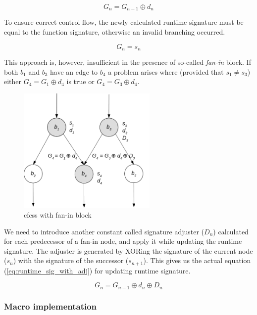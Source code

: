 \begin{equation}
\label{eq:runtime_sig}
G_n = G_{n-1} \oplus d_n
\end{equation}

To ensure correct control flow, the newly calculated runtime signature must be equal to the function signature, otherwise an invalid branching occurred.

\begin{equation}
\label{eq:sig_check}
G_n = s_n
\end{equation}

This approach is, however, insufficient in the presence of so-called \textit{fan-in} block. If both {$b_1$} and {$b_3$} have an edge to {$b_4$} a problem arises where (provided that {$s_1 \ne s_3$}) either {$G_4 = G_1 \oplus d_4$} is true or {$G_4 = G_3 \oplus d_4$}.

\begin{figure}[!h]
    \centering
    \includegraphics[width=0.6\textwidth]{diagrams/cfcss/adjuster.png}
    \caption{\acrshort{cfcss} with fan-in block \cite{coast:cfcss}}
\end{figure}

We need to introduce another constant called signature adjuster ({$D_n$}) calculated for each predecessor of a fan-in node, and apply it while updating the runtime signature. The adjuster is generated by XORing the signature of the current node ({$s_n$}) with the signature of the successor ({$s_{n+1}$}). This gives us the actual equation (\ref{eq:runtime_sig_with_adj}) for updating runtime signature.

\begin{equation}
\label{eq:runtime_sig_with_adj}
G_n = G_{n-1} \oplus d_n \oplus D_n
\end{equation}

\subsubsection{Macro implementation}

